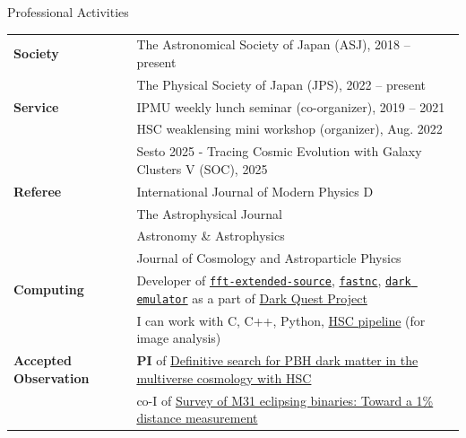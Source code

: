 \begin{rSection}{Professional Activities}
    \begin{tabular}{ @{} >{\bfseries}l @{\hspace{6ex}} p{}}
    Society              & The Astronomical Society of Japan (ASJ), 2018 -- present \\
                         & The Physical Society of Japan (JPS), 2022 -- present  \\
    Service              & IPMU weekly lunch seminar (co-organizer), 2019 -- 2021 \\
                         & HSC weaklensing mini workshop (organizer), Aug. 2022  \\
                         & Sesto 2025 - Tracing Cosmic Evolution with Galaxy Clusters V (SOC), 2025\\
    Referee              & International Journal of Modern Physics D \\
                         & The Astrophysical Journal \\
                         & Astronomy \& Astrophysics \\
                         & Journal of Cosmology and Astroparticle Physics \\
    Computing            & Developer of 
                           \href{https://github.com/git-sunao/fft-extended-source}{\tt fft-extended-source}, 
                           \href{https://github.com/git-sunao/fastnc}{\tt fastnc},
                           \href{https://dark-emulator.readthedocs.io/en/latest/}{\tt dark emulator} 
                           as a part of \href{https://darkquestcosmology.github.io}{Dark Quest Project} \\ 
                         & I can work with C, C++, Python, 
                           \href{https://hsc.mtk.nao.ac.jp/pipedoc/pipedoc_8_e/tutorial_e/index.html}{HSC pipeline} (for image analysis) \\
    Accepted Observation & {\textbf{PI}} of \href{https://subarutelescope.org/Observing/Schedule/S20B_abstract/S20B0032abst.html}{Definitive search for PBH dark matter in the multiverse cosmology with HSC} \\
                         & co-I of \href{https://www.naoj.org/Observing/Schedule/s24b.html}{Survey of M31 eclipsing binaries: Toward a 1\% distance measurement}
    \end{tabular}
\end{rSection}


